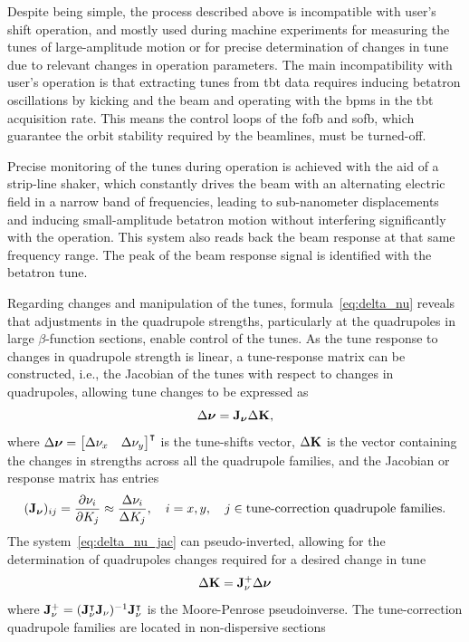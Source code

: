 Despite being simple, the process described above is incompatible with user's shift operation, and mostly used during machine experiments for measuring the tunes of large-amplitude motion or for precise determination of changes in tune due to relevant changes in operation parameters. The main incompatibility with user's operation is that extracting tunes from \gls*{tbt} data requires inducing betatron oscillations by kicking and the beam and operating with the \glspl*{bpm} in the \gls*{tbt} acquisition rate. This means the control loops of the \gls*{fofb} and \gls*{sofb}, which guarantee the orbit stability required by the beamlines, must be turned-off.

Precise  monitoring of the tunes during operation is achieved with the aid of a strip-line shaker, which constantly drives the beam with an alternating electric field in a narrow band of frequencies, leading to sub-nanometer displacements and inducing small-amplitude betatron motion without interfering significantly with the operation. This system also reads back the beam response at that same frequency range. The peak of the beam response signal is identified with the betatron tune.

Regarding changes and manipulation of the tunes, formula~\eqref{eq:delta_nu} reveals that adjustments in the quadrupole strengths, particularly at the quadrupoles in large $\beta$-function sections, enable control of the tunes. As the tune response to changes in quadrupole strength is linear, a tune-response matrix can be constructed, i.e., the Jacobian of the tunes with respect to changes in quadrupoles, allowing tune changes to be expressed as
\begin{equation}
    \Delta\boldsymbol{\nu} = \vb{J}_{\boldsymbol{\nu}}\Delta \vb{K},
    \label{eq:delta_nu_jac}
\end{equation}
where $\Delta\boldsymbol{\nu} = \mqty*[\Delta \nu_x & \Delta \nu_y]^\intercal$ is the tune-shifts vector, $\Delta \vb{K}$ is the vector containing the changes in strengths across all the quadrupole families, and the Jacobian or response matrix has entries
\begin{equation}
    (\vb{J}_{\boldsymbol{\nu}})_{ij} = \pdv{\nu_{i}}{K_j} \approx \frac{\Delta \nu_{i}}{\Delta K_j}, \quad i=x, y,\quad j\in\text{tune-correction quadrupole families}.
\end{equation}
The system~\eqref{eq:delta_nu_jac} can pseudo-inverted, allowing for the determination of quadrupoles changes required for a desired change in tune
\begin{equation}
    \Delta \vb{K} = \vb{J}_{\nu}^{+}\Delta \boldsymbol{\nu}
\end{equation}
where $\vb{J}_{\nu}^{+} = (\vb{J}_{\nu}^{\intercal}\vb{J}_{\nu})^{-1}\vb{J}_{\nu}^{\intercal}$ is the Moore-Penrose pseudoinverse.
The tune-correction quadrupole families are located in non-dispersive sections
